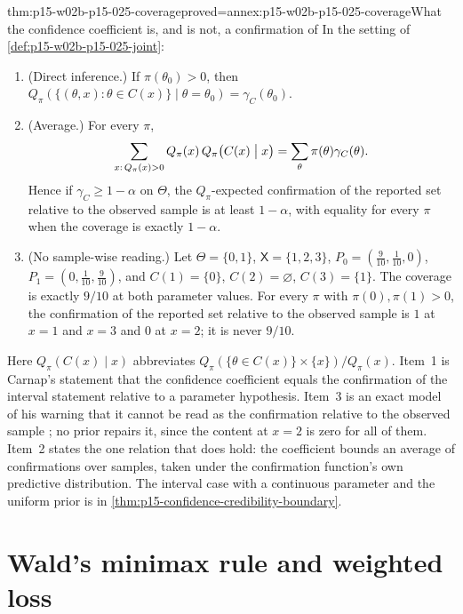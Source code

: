 \begin{hbtheorem}{thm:p15-w02b-p15-025-coverage}{proved=annex:p15-w02b-p15-025-coverage}{What the confidence coefficient is, and is not, a confirmation of}
In the setting of \cref{def:p15-w02b-p15-025-joint}:
\begin{enumerate}
\item (Direct inference.) If \(\pi(\theta_0)>0\), then
\(Q_\pi(\{(\theta,x):\theta\in C(x)\}\mid\theta=\theta_0)=\gamma_C(\theta_0)\).
\item (Average.) For every \(\pi\),
\[
 \sum_{x:\,Q_\pi(x)>0}Q_\pi(x)\,Q_\pi\bigl(C(x)\bigm|x\bigr)
 =\sum_{\theta}\pi(\theta)\gamma_C(\theta).
\]
Hence if \(\gamma_C\ge1-\alpha\) on \(\Theta\), the
\(Q_\pi\)-expected confirmation of the reported set relative to the
observed sample is at least \(1-\alpha\), with equality for every
\(\pi\) when the coverage is exactly \(1-\alpha\).
\item (No sample-wise reading.) Let \(\Theta=\{0,1\}\),
\(\mathsf X=\{1,2,3\}\),
\(P_0=(\frac9{10},\frac1{10},0)\), \(P_1=(0,\frac1{10},\frac9{10})\), and
\(C(1)=\{0\}\), \(C(2)=\varnothing\), \(C(3)=\{1\}\). The coverage is
exactly \(9/10\) at both parameter values. For every \(\pi\) with
\(\pi(0),\pi(1)>0\), the confirmation of the reported set relative to
the observed sample is \(1\) at \(x=1\) and \(x=3\) and \(0\) at
\(x=2\); it is never \(9/10\).
\end{enumerate}
\end{hbtheorem}

Here \(Q_\pi(C(x)\mid x)\) abbreviates
\(Q_\pi(\{\theta\in C(x)\}\times\{x\})/Q_\pi(x)\). Item~1 is Carnap's
statement that the confidence coefficient equals the confirmation of
the interval statement relative to a parameter hypothesis. Item~3 is an
exact model of his warning that it cannot be read as the confirmation
relative to the observed sample
\cite[sec.~98, p.~517]{Carnap1950Probability}; no prior repairs it,
since the content at \(x=2\) is zero for all of them. Item~2 states the
one relation that does hold: the coefficient bounds an average of
confirmations over samples, taken under the confirmation function's own
predictive distribution. The interval case with a continuous parameter
and the uniform prior is in \cref{thm:p15-confidence-credibility-boundary}.

\section{Wald's minimax rule and weighted loss}
\label{sec:p15-w02b-p15-025-minimax}

